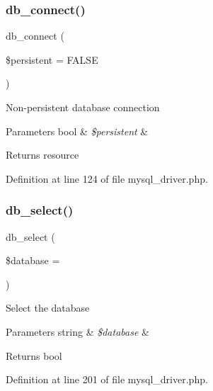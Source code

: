 \subsubsection{\texorpdfstring{db\_connect()}{db\_connect()}}
{\footnotesize\ttfamily db\+\_\+connect (\begin{DoxyParamCaption}\item[{}]{\$persistent = {\ttfamily FALSE} }\end{DoxyParamCaption})}

Non-\/persistent database connection


\begin{DoxyParams}[1]{Parameters}
bool & {\em \$persistent} & \\
\hline
\end{DoxyParams}
\begin{DoxyReturn}{Returns}
resource 
\end{DoxyReturn}


Definition at line 124 of file mysql\+\_\+driver.\+php.

\mbox{\label{class_c_i___d_b__mysql__driver_a18ae9c21870b30b45337c5e3626190cc}} 
\subsubsection{\texorpdfstring{db\_select()}{db\_select()}}
{\footnotesize\ttfamily db\+\_\+select (\begin{DoxyParamCaption}\item[{}]{\$database = {\ttfamily \textquotesingle{}\textquotesingle{}} }\end{DoxyParamCaption})}

Select the database


\begin{DoxyParams}[1]{Parameters}
string & {\em \$database} & \\
\hline
\end{DoxyParams}
\begin{DoxyReturn}{Returns}
bool 
\end{DoxyReturn}


Definition at line 201 of file mysql\+\_\+driver.\+php.

\mbox{\label{class_c_i___d_b__mysql__driver_a43b8d30b879d4f09ceb059b02af2bc02}} 

